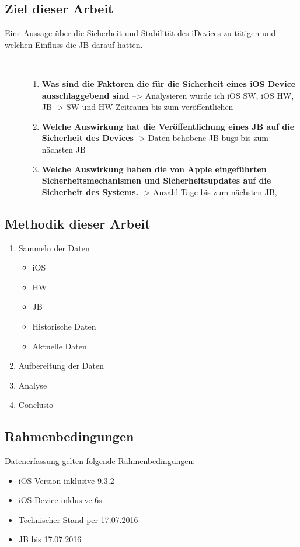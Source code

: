 \subsection{Ziel dieser Arbeit}
\label{sec:IntroZiel}
Eine Aussage über die Sicherheit und Stabilität des iDevices zu tätigen 
und welchen Einfluss die JB darauf hatten.
\begin{description}
    \item[\parbox{\textwidth} {Daraus ergeben sich folgende Fragestellungen}]~\par
    \begin{enumerate}
        \item \textbf{Was sind die Faktoren die für die Sicherheit eines iOS Device ausschlaggebend sind} --> Analysieren würde ich iOS SW, iOS HW, JB -> SW und HW Zeitraum bis zum veröffentlichen 
                
        \item \textbf{Welche Auswirkung hat die Veröffentlichung eines JB auf die Sicherheit des Devices} -> Daten behobene JB bugs bis zum nächsten JB  
        
        \item \textbf{Welche Auswirkung haben die von Apple eingeführten Sicherheitsmechanismen und Sicherheitsupdates auf die Sicherheit des Systems.}  -> Anzahl Tage bis zum nächsten JB,       
    \end{enumerate}
\end{description} 
 
 
\subsection{Methodik dieser Arbeit}
\label{sec:MethArbeit}

    \begin{enumerate}
        \item Sammeln der Daten
        \begin{itemize}
            \item iOS
            \item HW
            \item JB
            \item Historische Daten
            \item Aktuelle Daten
        \end{itemize}
        \item Aufbereitung der Daten
        \item Analyse 
        \item Conclusio
    \end{enumerate}


\subsection{Rahmenbedingungen}
\label{sec:Rahmenbedingungen}
Datenerfassung gelten folgende Rahmenbedingungen:
\begin{itemize}
    \item iOS Version inklusive 9.3.2
    \item iOS Device inklusive 6s
    \item Technischer Stand per 17.07.2016
    \item JB bis 17.07.2016
\end{itemize}






